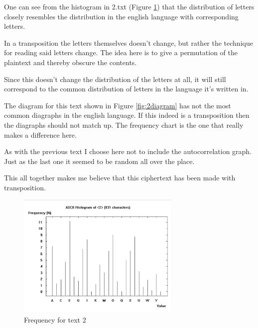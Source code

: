 One can see from the histogram in 2.txt (Figure \ref{fig:2freq}) that the distribution of letters closely resembles the distribution in the english language with corresponding letters.

In a transposition the letters themselves doesn't change, but rather the technique for reading said letters change.
The idea here is to give a permutation of the plaintext and thereby obscure the contents.

Since this doesn't change the distribution of the letters at all, it will still correspond to the common distribution of letters in the language it's written in.

The diagram for this text shown in Figure \ref{fig:2diagram} has not the most common diagraphs in the english language\cite{diagraphs}.
If this indeed is a transposition then the diagraphs should not match up.
The frequency chart is the one that really makes a difference here.

As with the previous text I choose here not to include the autocorrelation graph.
Just as the last one it seemed to be random all over the place.

This all together makes me believe that this ciphertext has been made with transposition.

\begin{figure}[ht!]
    \begin{center}
        \includegraphics[width=0.7\textwidth]{assets/2_frequency.png}
        \caption{Frequency for text 2}
        \label{fig:2freq}
    \end{center}
\end{figure}

